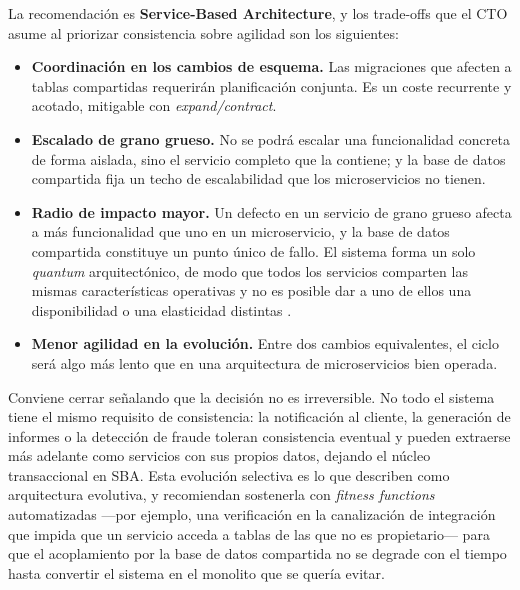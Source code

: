 La recomendación es \textbf{Service-Based Architecture}, y los trade-offs que el CTO asume al priorizar consistencia sobre agilidad son los siguientes:

\begin{itemize}[leftmargin=1.5em]
  \item \textbf{Coordinación en los cambios de esquema.} Las migraciones que afecten a tablas compartidas requerirán planificación conjunta. Es un coste recurrente y acotado, mitigable con \emph{expand/contract}.
  \item \textbf{Escalado de grano grueso.} No se podrá escalar una funcionalidad concreta de forma aislada, sino el servicio completo que la contiene; y la base de datos compartida fija un techo de escalabilidad que los microservicios no tienen.
  \item \textbf{Radio de impacto mayor.} Un defecto en un servicio de grano grueso afecta a más funcionalidad que uno en un microservicio, y la base de datos compartida constituye un punto único de fallo. El sistema forma un solo \emph{quantum} arquitectónico, de modo que todos los servicios comparten las mismas características operativas y no es posible dar a uno de ellos una disponibilidad o una elasticidad distintas \parencite{richardsford2020}.
  \item \textbf{Menor agilidad en la evolución.} Entre dos cambios equivalentes, el ciclo será algo más lento que en una arquitectura de microservicios bien operada.
\end{itemize}

Conviene cerrar señalando que la decisión no es irreversible. No todo el sistema tiene el mismo requisito de consistencia: la notificación al cliente, la generación de informes o la detección de fraude toleran consistencia eventual y pueden extraerse más adelante como servicios con sus propios datos, dejando el núcleo transaccional en SBA. Esta evolución selectiva es lo que \textcite{fordevolutionary2017} describen como arquitectura evolutiva, y recomiendan sostenerla con \emph{fitness functions} automatizadas ---por ejemplo, una verificación en la canalización de integración que impida que un servicio acceda a tablas de las que no es propietario--- para que el acoplamiento por la base de datos compartida no se degrade con el tiempo hasta convertir el sistema en el monolito que se quería evitar.
